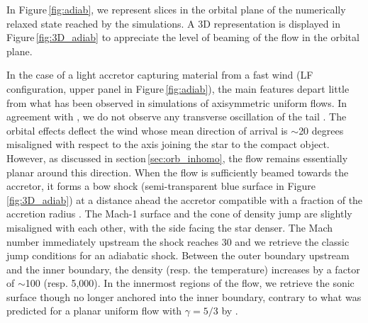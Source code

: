 \documentclass{aa}
\begin{document}
In Figure\,\ref{fig:adiab}, we represent slices in the orbital plane of the numerically relaxed state reached by the simulations. A 3D representation is displayed in Figure\,\ref{fig:3D_adiab} to appreciate the level of beaming of the flow in the orbital plane.

In the case of a light accretor capturing material from a fast wind (LF configuration, upper panel in Figure\,\ref{fig:adiab}), the main features depart little from what has been observed in simulations of axisymmetric uniform flows. In agreement with \cite{Blondin:2012vf}, we do not observe any transverse oscillation of the tail \citep[the so-called "flip-flop instability" which arises mostly in 2D polar numerical setups,][]{Foglizzo2005}. The orbital effects deflect the wind whose mean direction of arrival is $\sim$20 degrees misaligned with respect to the axis joining the star to the compact object. However, as discussed in section\,\ref{sec:orb_inhomo}, the flow remains essentially planar around this direction. When the flow is sufficiently beamed towards the accretor, it forms a bow shock (semi-transparent blue surface in Figure\,\ref{fig:3D_adiab}) at a distance ahead the accretor compatible with a fraction of the accretion radius \citep{Edgar:2004ip}. The Mach-1 surface and the cone of density jump are slightly misaligned with each other, with the side facing the star denser. The Mach number immediately upstream the shock reaches 30 and we retrieve the classic jump conditions for an adiabatic shock. Between the outer boundary upstream and the inner boundary, the density (resp. the temperature) increases by a factor of $\sim$100 (resp. 5,000). In the innermost regions of the flow, we retrieve the sonic surface though no longer anchored into the inner boundary, contrary to what was predicted for a planar uniform flow with $\gamma=5/3$ by \cite{Foglizzo1996}.
\end{document}
